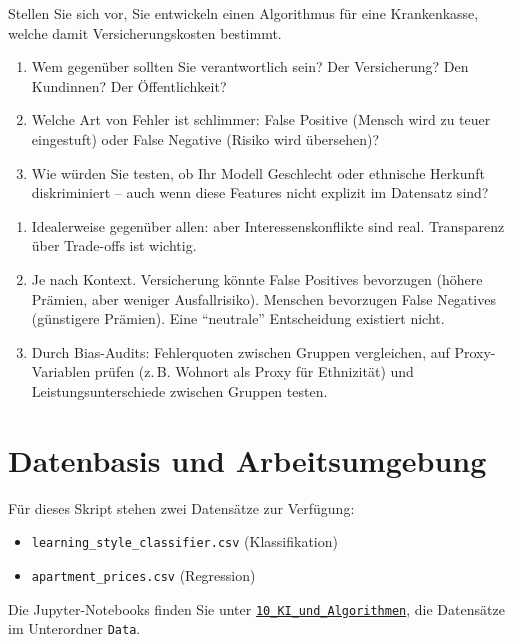 \begin{mychallenge}
Stellen Sie sich vor, Sie entwickeln einen Algorithmus für eine Krankenkasse, welche damit Versicherungskosten bestimmt.
\begin{enumerate}
    \item Wem gegenüber sollten Sie verantwortlich sein? Der Versicherung? Den Kundinnen? Der Öffentlichkeit?
    \item Welche Art von Fehler ist schlimmer: False Positive (Mensch wird zu teuer eingestuft) oder False Negative (Risiko wird übersehen)?
    \item Wie würden Sie testen, ob Ihr Modell Geschlecht oder ethnische Herkunft diskriminiert -- auch wenn diese Features nicht explizit im Datensatz sind?
\end{enumerate}
\begin{myanswer}
    \begin{enumerate}
        \item Idealerweise gegenüber allen: aber Interessenskonflikte sind real. Transparenz über Trade-offs ist wichtig.
        \item Je nach Kontext. Versicherung könnte False Positives bevorzugen (höhere Prämien, aber weniger Ausfallrisiko). Menschen bevorzugen False Negatives (günstigere Prämien). Eine \enquote{neutrale} Entscheidung existiert nicht.
        \item Durch Bias-Audits: Fehlerquoten zwischen Gruppen vergleichen, auf Proxy-Va\-ri\-ablen prüfen (z.\,B. Wohnort als Proxy für Ethnizität) und Leistungsunterschiede zwischen Gruppen testen.
    \end{enumerate}
\end{myanswer}
\end{mychallenge}

\section{Datenbasis und Arbeitsumgebung}

Für dieses Skript stehen zwei Datensätze zur Verfügung:
\begin{itemize}
    \item \texttt{learning\_style\_classifier.csv} (Klassifikation)
    \item \texttt{apartment\_prices.csv} (Regression)
\end{itemize}

Die Jupyter-Notebooks finden Sie unter \href{\notebookurl}{\texttt{10\_KI\_und\_Algorithmen}}, die Datensätze im Unterordner \texttt{Data}.
